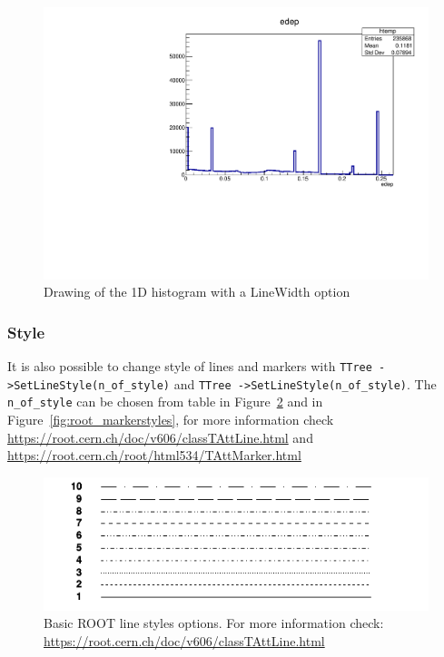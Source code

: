 \documentclass[12pt]{article}
\begin{document}
\begin{figure}[h]
\centering
\includegraphics[scale=0.5]{figs/1Dhist_linewidth.pdf}
\caption{Drawing of the 1D histogram with a LineWidth option}
\label{fig:1Dhist_color_linewidth}
\end{figure}

\subsubsection{Style}
It is also possible to change style of lines and markers with \verb|TTree ->SetLineStyle(n_of_style)| and  \verb|TTree ->SetLineStyle(n_of_style)|. The \verb|n_of_style| can be chosen from table in Figure~\ref{fig:root_linestyles} and in Figure~\ref{fig:root_markerstyles}, for more information check \\
\href{https://root.cern.ch/doc/v606/classTAttLine.html}{https://root.cern.ch/doc/v606/classTAttLine.html} and\\ \href{https://root.cern.ch/root/html534/TAttMarker.html}{https://root.cern.ch/root/html534/TAttMarker.html} \\

\begin{figure}[h]
\centering
\includegraphics[scale=0.5]{figs/root_linestyles.png}
\caption{Basic ROOT line styles options. For more information check: \href{https://root.cern.ch/doc/v606/classTAttLine.html}{https://root.cern.ch/doc/v606/classTAttLine.html} }
\label{fig:root_linestyles}
\end{figure}
\end{document}
